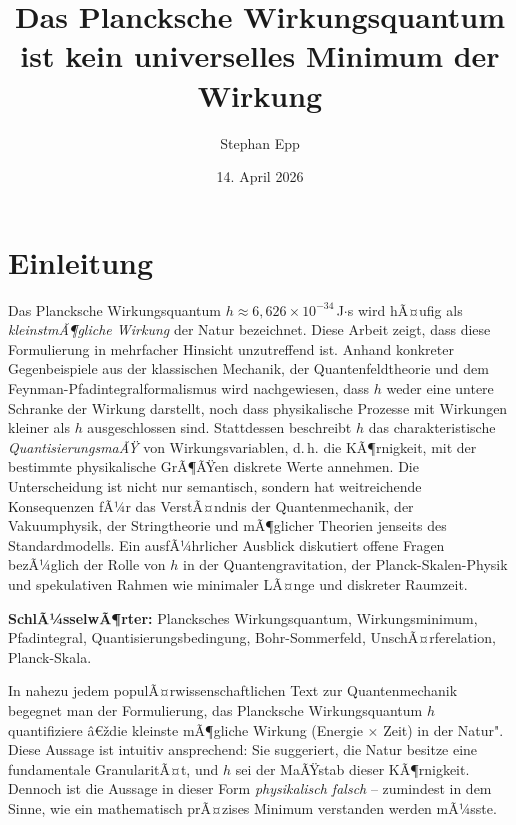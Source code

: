 ﻿\documentclass[12pt,a4paper]{article}
\title{\textbf{Das Plancksche Wirkungsquantum ist kein universelles Minimum der Wirkung}}
\author{Stephan Epp}
\date{14. April 2026}
\theoremstyle{plain}
\theoremstyle{definition}
\theoremstyle{remark}
\begin{document}
\maketitle
\tableofcontents
\newpage

\section{Einleitung}
    Das Plancksche Wirkungsquantum $h \approx 6{,}626 \times 10^{-34}$\,J$\cdot$s wird hÃ¤ufig
als \emph{kleinstmÃ¶gliche Wirkung} der Natur bezeichnet. Diese Arbeit zeigt, dass diese
Formulierung in mehrfacher Hinsicht unzutreffend ist. Anhand konkreter Gegenbeispiele aus
der klassischen Mechanik, der Quantenfeldtheorie und dem Feynman-Pfadintegralformalismus
wird nachgewiesen, dass $h$ weder eine untere Schranke der Wirkung darstellt, noch dass
physikalische Prozesse mit Wirkungen kleiner als $h$ ausgeschlossen sind. Stattdessen
beschreibt $h$ das charakteristische \emph{QuantisierungsmaÃŸ} von Wirkungsvariablen,
d.\,h. die KÃ¶rnigkeit, mit der bestimmte physikalische GrÃ¶ÃŸen diskrete Werte annehmen.
Die Unterscheidung ist nicht nur semantisch, sondern hat weitreichende Konsequenzen fÃ¼r
das VerstÃ¤ndnis der Quantenmechanik, der Vakuumphysik, der Stringtheorie und
mÃ¶glicher Theorien jenseits des Standardmodells. Ein ausfÃ¼hrlicher Ausblick diskutiert
offene Fragen bezÃ¼glich der Rolle von $h$ in der Quantengravitation, der
Planck-Skalen-Physik und spekulativen Rahmen wie minimaler LÃ¤nge und diskreter Raumzeit.

\textbf{SchlÃ¼sselwÃ¶rter:} Plancksches Wirkungsquantum, Wirkungsminimum, Pfadintegral,
Quantisierungsbedingung, Bohr-Sommerfeld, UnschÃ¤rferelation, Planck-Skala.

In nahezu jedem populÃ¤rwissenschaftlichen Text zur Quantenmechanik begegnet man der Formulierung,
das Plancksche Wirkungsquantum $h$ quantifiziere â€ždie kleinste mÃ¶gliche Wirkung (Energie $\times$ Zeit)
in der Natur". Diese Aussage ist intuitiv ansprechend: Sie suggeriert, die Natur besitze eine fundamentale
GranularitÃ¤t, und $h$ sei der MaÃŸstab dieser KÃ¶rnigkeit. Dennoch ist die Aussage in dieser Form
\emph{physikalisch falsch} -- zumindest in dem Sinne, wie ein mathematisch prÃ¤zises Minimum verstanden werden mÃ¼sste.
\end{document}
